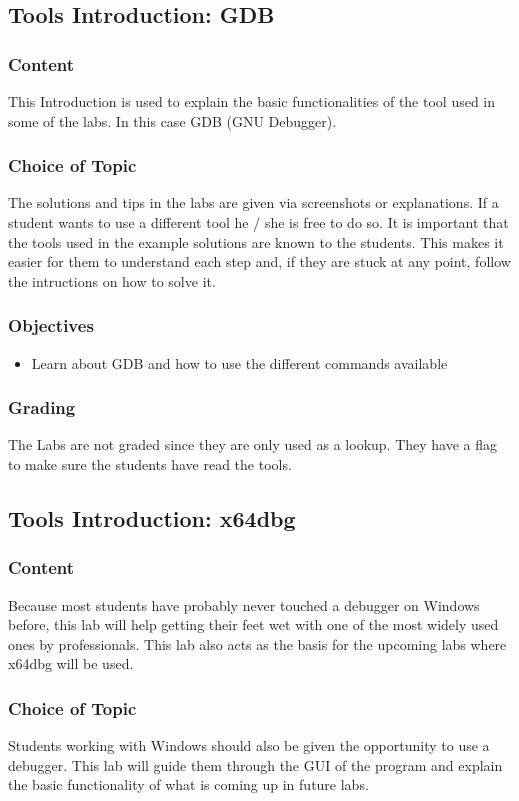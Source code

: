 \subsection{Tools Introduction: GDB}
\subsubsection*{Content}
This Introduction is used to explain the basic functionalities of the tool used in some of the labs. In this case GDB (GNU Debugger).
\subsubsection*{Choice of Topic}
The solutions and tips in the labs are given via screenshots or explanations. If a student wants to use a different tool he / she is free to do so. It is important that the tools used in the example solutions are known to the students. This makes it easier for them to understand each step and, if they are stuck at any point, follow the intructions on how to solve it. 
\subsubsection*{Objectives}
\begin{itemize}
    \item Learn about GDB and how to use the different commands available
\end{itemize}
\subsubsection*{Grading}
The Labs are not graded since they are only used as a lookup. They have a flag to make sure the students have read the tools.

\subsection{Tools Introduction: x64dbg}
\subsubsection*{Content}
Because most students have probably never touched a debugger on Windows before, this lab will help getting their feet wet with one of the most widely used ones by professionals.
This lab also acts as the basis for the upcoming labs where x64dbg will be used.
\subsubsection*{Choice of Topic}
Students working with Windows should also be given the opportunity to use a debugger. This lab will guide them through the GUI of the program and explain the basic functionality of what is coming up in future labs.
